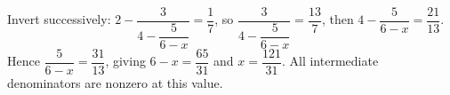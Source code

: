 Invert successively: $2-\dfrac{3}{4-\dfrac{5}{6-x}}=\dfrac{1}{7}$, so $\dfrac{3}{4-\dfrac{5}{6-x}}=\dfrac{13}{7}$, then $4-\dfrac{5}{6-x}=\dfrac{21}{13}$. Hence $\dfrac{5}{6-x}=\dfrac{31}{13}$, giving $6-x=\dfrac{65}{31}$ and $\boxed{x=\dfrac{121}{31}}$. All intermediate denominators are nonzero at this value.
